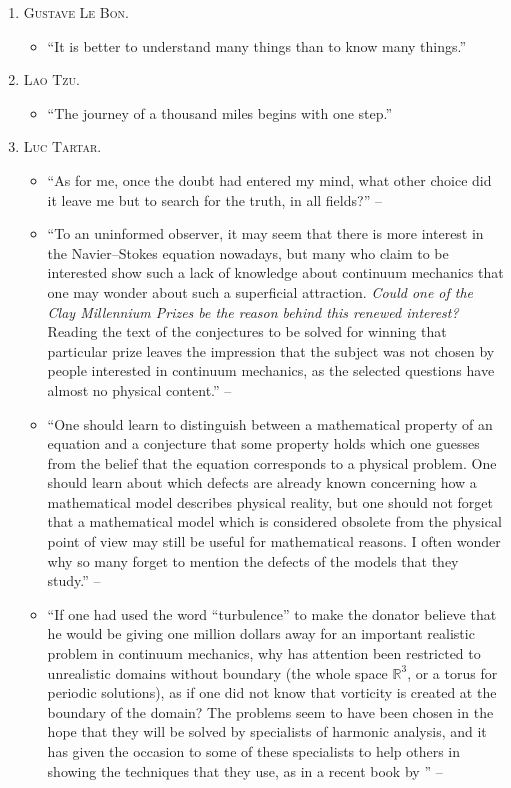 \documentclass[oneside]{book}
\numberwithin{equation}{section}
\begin{document}
\begin{enumerate}
\begin{itemize}
	\end{itemize}
	\item \textsc{Gustave Le Bon.}
	\begin{itemize}
		\item ``It is better to understand many things than to know many things.''
	\end{itemize}
	\item \textsc{Lao Tzu.}
	\begin{itemize}
		\item ``The journey of a thousand miles begins with one step.''
	\end{itemize}
	\item \textsc{Luc Tartar.}
	\begin{itemize}
		\item ``As for me, once the doubt had entered my mind, what other choice did it leave me but to search for the truth, in all fields?'' -- \cite{Tartar2006}
		\item ``To an uninformed observer, it may seem that there is more interest in the Navier--Stokes equation nowadays, but many who claim to be interested show such a lack of knowledge about continuum mechanics that one may wonder about such a superficial attraction. \textit{Could one of the Clay Millennium Prizes be the reason behind this renewed interest?} Reading the text of the conjectures to be solved for winning that particular prize leaves the impression that the subject was not chosen by people interested in continuum mechanics, as the selected questions have almost no physical content.'' -- \cite[Preface, p. vii]{Tartar2006}		
		\item ``One should learn to distinguish between a mathematical property of an equation and a conjecture that some property holds which one guesses from the belief that the equation corresponds to a physical problem. One should learn about which defects are already known concerning how a mathematical model describes physical reality, but one should not forget that a mathematical model which is considered obsolete from the physical point of view may still be useful for mathematical reasons. I often wonder why so many forget to mention the defects of the models that they study.'' -- \cite[Preface, p. vii]{Tartar2006}		
		\item ``If one had used the word ``turbulence'' to make the donator believe that he would be giving one million dollars away for an important realistic problem in continuum mechanics, why has attention been restricted to unrealistic domains without boundary (the whole space $\mathbb{R}^3$, or a torus for periodic solutions), as if one did not know that vorticity is created at the boundary of the domain? The problems seem to have been chosen in the hope that they will be solved by specialists of harmonic analysis, and it has given the occasion to some of these specialists to help others in showing the techniques that they use, as in a recent book by \cite{Lemarie-Rieusset2016}'' -- \cite[Preface, p. viii]{Tartar2006}		

\end{itemize}
\end{enumerate}
\end{document}
